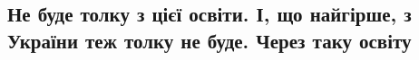  
 
 
 
 

\subsection{Не буде толку з цієї освіти. І, що найгірше, з України теж толку не буде. Через таку освіту}
\label{sec:06_05_2020.fb.1.ukrlit_marusja_churaj_shkola}

